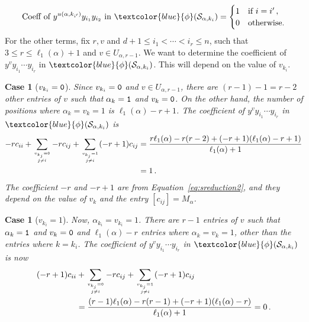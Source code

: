 \documentclass[10pt,a4paper]{article}
\newcommand{\blue}[1]{\textcolor{blue}{#1}}
\newcounter{casecount}  \setcounter{casecount}{0}
\newtheorem{case}[casecount]{Case}
\begin{document}
\begin{equation}\label{eq:coefr=2}
  \text{Coeff  of } y^{u(\alpha, k_{i'})} y_{i_1} y_{i_2} \text{ in  } \blue{\phi} (\mathcal{S}_{\alpha, k_{i}})  = 
  \begin{cases}
  	1 &\text{if } i=i'\,,\\
	0& \text{otherwise.}
  \end{cases}
  \end{equation}
For the other terms, fix $r, v$ and $d+1 \leq i_1 < \cdots < i_r \leq n$, such that $3 \leq r \leq \ell_1(\alpha)+1$ and  $v \in U_{\alpha,r-1}$.
We want to determine the coefficient of $y^{v} y_{i_1} \cdots y_{i_{r}}$ in $\blue{\phi} (\mathcal{S}_{\alpha, k_{i}}) $. This will depend on the value of $v_{k_i}$.

\begin{case}[{\it $v_{k_i}=\textnormal{\texttt{0}}$}\null] \label{vk=0} 
Since $v_{k_i}=\textnormal{\texttt{0}}$ and $v \in U_{\alpha,r-1}$, there are $(r-1)-1=r-2$ other entries of $v$ such that $\alpha_k=\textnormal{\texttt{1}}$ and $v_k=\textnormal{\texttt{0}}$.
On the other hand, the number of positions where $\alpha_k=v_k=1$ is $\ell_1(\alpha)-r+1$.
The coefficient of $y^{v} y_{i_1} \cdots y_{i_{r}}$ in $\blue{\phi} (\mathcal{S}_{\alpha, k_{i}}) $ is
\begin{align*}
 -rc_{ii}  + \sum_{v_{k_j}=\textnormal{\texttt{0}} \atop j\ne i}  -rc_{ij}   + \sum_{v_{k_j}=1 \atop j\ne i}  (-r+1)c_{ij}  
    &= \frac{r\ell_1(\alpha) -r(r-2) + (-r+1)(\ell_1(\alpha)-r+1)}{\ell_1(\alpha)+1} \\
    &= 1\,.
 \end{align*}
 The coefficient $-r$ and $-r+1$ are from Equation~\eqref{eq:sreduction2}, and they depend on the value of $v_k$ and the entry $[c_{ij}]=M_\alpha$.
\end{case} 

\begin{case}[{\it $v_{k_i}=1$}\null] \label{vk=1} 
Now, $\alpha_{k_i}=v_{k_i}=1$. There are $r-1$ entries of $v$ such that $\alpha_k=\textnormal{\texttt{1}}$ and $v_k=\textnormal{\texttt{0}}$
and $\ell_1(\alpha)-r$ entries where $\alpha_k=v_k=1$, other than the entries where $k=k_i$.
The coefficient of $y^{v} y_{i_1} \cdots y_{i_{r}}$ in $\blue{\phi} (\mathcal{S}_{\alpha, k_{i}}) $ is now
\begin{align*}
 (-r+1)c_{ii}  &+ \sum_{v_{k_j}=\textnormal{\texttt{0}} \atop j\ne i}  -rc_{ij}   + \sum_{v_{k_j}=1 \atop j\ne i}  (-r+1)c_{ij}  \\
    &= \frac{(r-1)\ell_1(\alpha) -r(r-1) + (-r+1)(\ell_1(\alpha)-r)}{\ell_1(\alpha)+1} 
    = 0\,.
 \end{align*}
\end{case}
 
\end{document}
